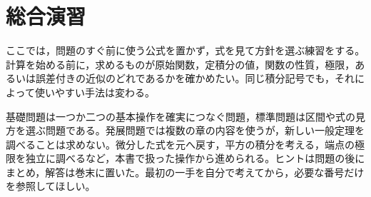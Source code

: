 \chapter{総合演習}\label{章:総合演習}

ここでは，問題のすぐ前に使う公式を置かず，式を見て方針を選ぶ練習をする。計算を始める前に，求めるものが原始関数，定積分の値，関数の性質，極限，あるいは誤差付きの近似のどれであるかを確かめたい。同じ積分記号でも，それによって使いやすい手法は変わる。

基礎問題は一つか二つの基本操作を確実につなぐ問題，標準問題は区間や式の見方を選ぶ問題である。発展問題では複数の章の内容を使うが，新しい一般定理を調べることは求めない。微分した式を元へ戻す，平方の積分を考える，端点の極限を独立に調べるなど，本書で扱った操作から進められる。ヒントは問題の後にまとめ，解答は巻末に置いた。最初の一手を自分で考えてから，必要な番号だけを参照してほしい。

%
%
%
%
